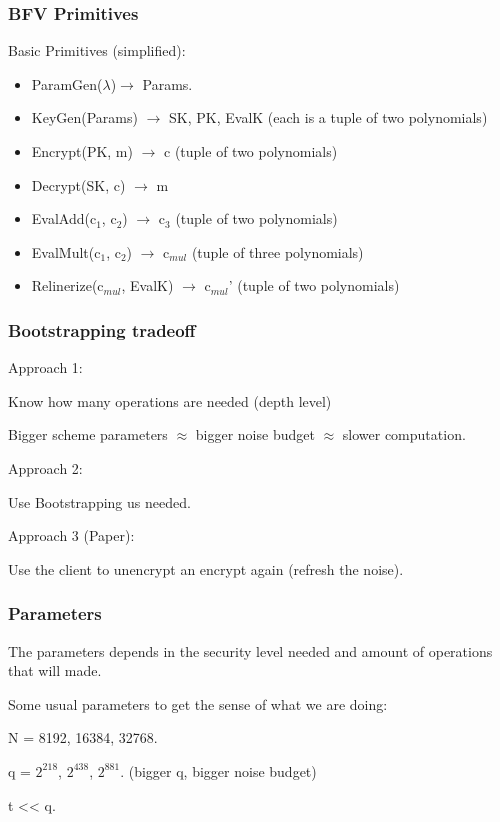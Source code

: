 \documentclass[10pt,handout]{beamer}
\begin{document}
\begin{frame}
\frametitle{BFV Primitives}

    Basic Primitives (simplified):
\begin{itemize}
    \item ParamGen($\lambda$)$\rightarrow$ Params.
    \item KeyGen(Params) $\rightarrow$ SK, PK, EvalK (each is a tuple of two polynomials)
   \item Encrypt(PK, m) $\rightarrow$ c (tuple of two polynomials)
    \item Decrypt(SK, c) $\rightarrow$ m
    \item EvalAdd(c$_1$, c$_2$) $\rightarrow$ c$_3$ (tuple of two polynomials)
    \item EvalMult(c$_1$, c$_2$) $\rightarrow$ c$_{mul}$ (tuple of three polynomials)
    \item Relinerize(c$_{mul}$, EvalK) $\rightarrow$ c$_{mul}$' (tuple of two polynomials)
\end{itemize}

\end{frame}


\begin{frame}
    \frametitle{Bootstrapping tradeoff}

    Approach 1:

    Know how many operations are needed (depth level)

    Bigger scheme parameters $\approx$ bigger noise budget $\approx$ slower computation.

    Approach 2:

    Use Bootstrapping us needed.


    Approach 3 (Paper):

    Use the client to unencrypt an encrypt again (refresh the noise).
\end{frame}




\begin{frame}
\frametitle{Parameters}

The parameters depends in the security level needed and amount of operations that will made.


Some usual parameters to get the sense of what we are doing:

N = 8192, 16384, 32768.

    q = $2^{218}$,   $2^{438}$,  $2^{881}$. (bigger q, bigger noise budget)

t  << q.



\end{frame}
\end{document}
